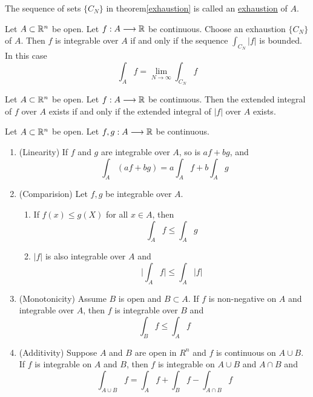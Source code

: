\begin{definition}
    The sequence of sets $\{C_N\}$ in theorem\ref{exhaustion} is called an \underline{exhaustion} of $A$.
\end{definition}

\begin{theorem}\label{Equivalent definition of extended intrgral 1}
    Let $A\subset\mathbb{R}^n$ be open. Let $f:A\longrightarrow\mathbb{R}$ be continuous. Choose an exhaustion $\{C_N\}$ of $A$. Then $f$ is integrable over $A$ if and only if the sequence $\int_{C_N}|f|$ is bounded. In this case $$\int_Af=\lim_{N\to \infty}\int_{C_N}f$$
\end{theorem}

\begin{corollary}
    Let $A\subset\mathbb{R}^n$ be open. Let $f:A\longrightarrow\mathbb{R}$ be continuous. Then the extended integral of $f$ over $A$ exists if and only if the extended integral of $|f|$ over $A$ exists.
\end{corollary}

\begin{theorem}\label{Properties of extended integral}
    Let $A\subset\mathbb{R}^n$ be open. Let $f,g:A\longrightarrow\mathbb{R}$ be continuous.
    \begin{enumerate}
        \item (Linearity) If $f$ and $g$ are integrable over $A$, so is $af+bg$, and
        $$\int_A(af+bg)=a\int_Af+b\int_Ag$$
        \item (Comparision) Let $f,g$ be integrable over $A$.
        \begin{enumerate}
            \item If $f(x)\leq g(X)$ for all $x\in A$, then $$\int_Af\leq \int_Ag$$
            \item $|f|$ is also integrable over $A$ and $$\big|\int_Af\big|\leq \int_A|f|$$
        \end{enumerate}
        \item (Monotonicity) Assume $B$ is open and $B\subset A$. If $f$ is non-negative on $A$ and integrable over $A$, then $f$ is integrable over $B$ and $$\int_Bf\leq\int_Af$$
        \item (Additivity) Suppose $A$ and $B$ are open in $R^n$ and $f$ is continuous on $A\cup B$. If $f$ is integrable on $A$ and $B$, then $f$ is integrable on $A\cup B$ and $A \cap B$ and $$\int_{A\cup B}f=\int_Af+\int_Bf-\int_{A\cap B}f$$
    \end{enumerate}
\end{theorem}

